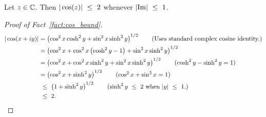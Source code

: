 \begin{fact}
\label{fact:cos_bound}
    Let $z \in \mathbb{C}$. Then $|\cos(z)| ~\le~ 2$ whenever $|\mathrm{Im}| ~\le~ 1$.
\end{fact}
\begin{proof}[Proof of Fact~\ref{fact:cos_bound}]
   \begin{align*}
       \abs{ \cos(x + i y) } & = \left( \cos^2 x \cosh^2 y + \sin^2 x \sinh^2 y \right)^{1/2} \tag{Uses standard complex cosine identity.} \\
       & = \left( \cos^2 x  +  \cos^2 x \left(\cosh^2 y - 1 \right) + \sin^2 x \sinh^2 y \right)^{1/2}  \\
        & = \left( \cos^2 x  +  \cos^2 x \sinh^2 y + \sin^2 x \sinh^2 y \right)^{1/2} \tag{$\cosh^2 y - \sinh^2 y = 1$} \\
         & = \left( \cos^2 x  +   \sinh^2 y \right)^{1/2} \tag{$\cos^2 x + \sin^2 x = 1$} \\
         & \leq \left( 1  +   \sinh^2 y \right)^{1/2} \tag{$\sinh^2 y \leq 2$ when $\abs{y} \leq 1$.} \\
          & \leq 2.
   \end{align*}
\end{proof}


